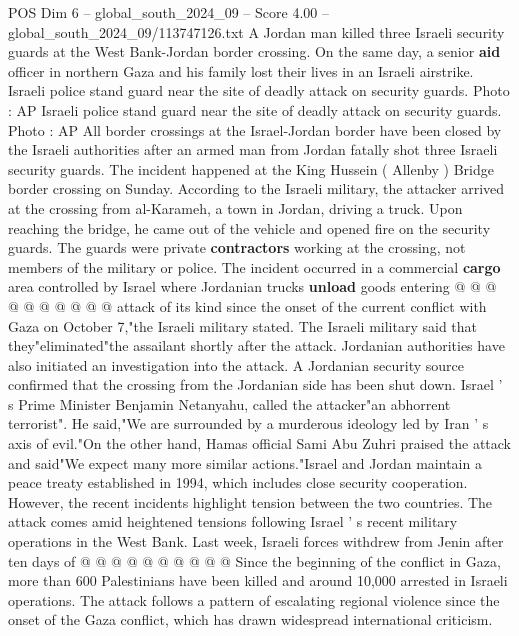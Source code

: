 \begin{textsample}{POS Dim 6 – global\_south\_2024\_09 – Score 4.00 – global\_south\_2024\_09/113747126.txt}  \label{ex:f6_pos_436}
A Jordan man killed three Israeli security guards at the West Bank-Jordan border crossing.
On the same day, a senior \textbf{aid} officer in northern Gaza and his family lost their lives in an Israeli airstrike.
Israeli police stand guard near the site of deadly attack on security guards.
Photo : AP Israeli police stand guard near the site of deadly attack on security guards.
Photo : AP All border crossings at the Israel-Jordan border have been closed by the Israeli authorities after an armed man from Jordan fatally shot three Israeli security guards.
The incident happened at the King Hussein ( Allenby ) Bridge border crossing on Sunday.
According to the Israeli military, the attacker arrived at the crossing from al-Karameh, a town in Jordan, driving a truck.
Upon reaching the bridge, he came out of the vehicle and opened fire on the security guards.
The guards were private \textbf{contractors} working at the crossing, not members of the military or police.
The incident occurred in a commercial \textbf{cargo} area controlled by Israel where Jordanian trucks \textbf{unload} goods entering @ @ @ @ @ @ @ @ @ @ attack of its kind since the onset of the current conflict with Gaza on October 7,"the Israeli military stated.
The Israeli military said that they"eliminated"the assailant shortly after the attack.
Jordanian authorities have also initiated an investigation into the attack.
A Jordanian security source confirmed that the crossing from the Jordanian side has been shut down.
Israel ' s Prime Minister Benjamin Netanyahu, called the attacker"an abhorrent terrorist".
He said,"We are surrounded by a murderous ideology led by Iran ' s axis of evil."On the other hand, Hamas official Sami Abu Zuhri praised the attack and said"We expect many more similar actions."Israel and Jordan maintain a peace treaty established in 1994, which includes close security cooperation.
However, the recent incidents highlight tension between the two countries.
The attack comes amid heightened tensions following Israel ' s recent military operations in the West Bank.
Last week, Israeli forces withdrew from Jenin after ten days of @ @ @ @ @ @ @ @ @ @ Since the beginning of the conflict in Gaza, more than 600 Palestinians have been killed and around 10,000 arrested in Israeli operations.
The attack follows a pattern of escalating regional violence since the onset of the Gaza conflict, which has drawn widespread international criticism.

\end{textsample}
